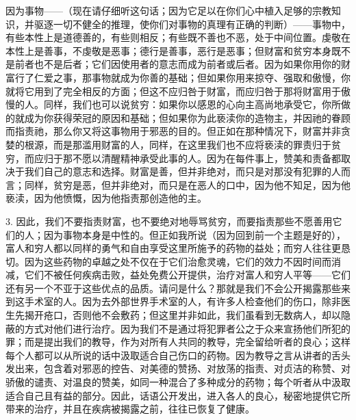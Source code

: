 因为事物——（现在请仔细听这句话；因为它足以在你们心中植入足够的宗教知识，并驱逐一切不健全的推理，使你们对事物的真理有正确的判断）——事物中，有些本性上是道德善的，有些则相反；有些既不善也不恶，处于中间位置。虔敬在本性上是善事，不虔敬是恶事；德行是善事，恶行是恶事；但财富和贫穷本身既不是前者也不是后者；它们因使用者的意志而成为前者或后者。因为如果你用你的财富行了仁爱之事，那事物就成为你善的基础；但如果你用来掠夺、强取和傲慢，你就将它用到了完全相反的方面；但这不应归咎于财富，而应归咎于那将财富用于傲慢的人。同样，我们也可以说贫穷：如果你以感恩的心向主高尚地承受它，你所做的就成为你获得荣冠的原因和基础；但如果你为此亵渎你的造物主，并因祂的眷顾而指责祂，那么你又将这事物用于邪恶的目的。但正如在那种情况下，财富并非贪婪的根源，而是那滥用财富的人，同样，在这里我们也不应将亵渎的罪责归于贫穷，而应归于那不愿以清醒精神承受此事的人。因为在每件事上，赞美和责备都取决于我们自己的意志和选择。财富是善，但并非绝对，而只是对那没有犯罪的人而言；同样，贫穷是恶，但并非绝对，而只是在恶人的口中，因为他不知足，因为他亵渎，因为他愤慨，因为他指责那创造他的主。\par

3. 因此，我们不要指责财富，也不要绝对地辱骂贫穷，而要指责那些不愿善用它们的人；因为事物本身是中性的。但正如我所说（因为回到前一个主题是好的），富人和穷人都以同样的勇气和自由享受这里所施予的药物的益处；而穷人往往更恳切。因为这些药物的卓越之处不仅在于它们治愈灵魂，它们的效力不因时间而消减，它们不被任何疾病击败，益处免费公开提供，治疗对富人和穷人平等——它们还有另一个不亚于这些优点的品质。请问是什么？那就是我们不会公开揭露那些来到这手术室的人。因为去外部世界手术室的人，有许多人检查他们的伤口，除非医生先揭开疮口，否则他不会敷药；但这里并非如此，我们虽看到无数病人，却以隐蔽的方式对他们进行治疗。因为我们不是通过将犯罪者公之于众来宣扬他们所犯的罪；而是提出我们的教导，作为对所有人共同的教导，完全留给听者的良心；这样每个人都可以从所说的话中汲取适合自己伤口的药物。因为教导之言从讲者的舌头发出来，包含着对邪恶的控告、对美德的赞扬、对放荡的指责、对贞洁的称赞、对骄傲的谴责、对温良的赞美，如同一种混合了多种成分的药物；每个听者从中汲取适合自己且有益的部分。因此，话语公开发出，进入各人的良心，秘密地提供它所带来的治疗，并且在疾病被揭露之前，往往已恢复了健康。\par

